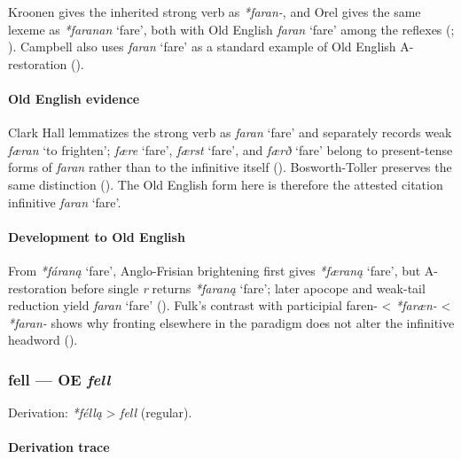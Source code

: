 \documentclass[
  british,
  a4paper,
]{article}
\providecommand{\Recon}[1]{\emph{*#1}}
\begin{document}
Kroonen gives the inherited strong verb as \emph{*faran-}, and Orel
gives the same lexeme as \Recon{faranan} `fare', both with Old English
\emph{faran} `fare' among the reflexes
(; ). Campbell also uses \emph{faran} `fare' as a standard
example of Old English A-restoration
().

\paragraph{Old English evidence}\label{old-english-evidence-15}

Clark Hall lemmatizes the strong verb as \emph{faran} `fare' and
separately records weak \emph{færan} `to frighten'; {\emph{fære}}
`fare', {\emph{færst}} `fare', and {\emph{færð}} `fare' belong to
present-tense forms of \emph{faran} rather than to the infinitive itself
(). Bosworth-Toller
preserves the same distinction
(). The
Old English form here is therefore the attested citation infinitive
\emph{faran} `fare'.

\paragraph{Development to Old
English}\label{development-to-old-english-15}

From \Recon{fáraną} `fare', Anglo-Frisian brightening first gives
\Recon{færaną} `fare', but A-restoration before single \emph{r} returns
\Recon{faraną} `fare'; later apocope and weak-tail reduction yield
\emph{faran} `fare' ().
Fulk's contrast with participial faren- \textless{} \emph{*faræn-}
\textless{} \emph{*faran-} shows why fronting elsewhere in the paradigm
does not alter the infinitive headword ().

\subsubsection{\texorpdfstring{fell --- OE
\emph{fell}}{fell --- OE fell}}\label{fell-oe-fell}

Derivation: \emph{*féllą} \textgreater{} \emph{fell} (regular).

\paragraph{Derivation trace}\label{derivation-trace-17}
\end{document}
